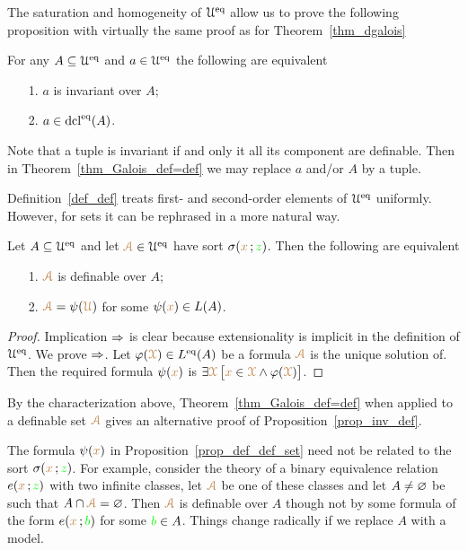 \documentclass[creche.tex]{subfiles}
\begin{document}
The saturation and homogeneity of $\EuScript U^{{\rm eq}}$ allow us to prove the following proposition with virtually the same proof as for Theorem~\ref{thm_dgalois}

\begin{theorem}\label{thm_Galois_def=def}
For any $A\subseteq\EuScript U^{{\rm eq}}$ and $a\in\EuScript U^{{\rm eq}}$ the following are equivalent
\begin{itemize}
\item[1.] $a$ is invariant over $A$;
\item[2.] $a\in\mathop{\rm dcl}^{{\rm eq}}(A)$.\QED
\end{itemize}
\end{theorem}

Note that a tuple is invariant if and only it all its component are definable. Then in Theorem~\ref{thm_Galois_def=def} we may replace $a$ and/or $A$ by a tuple.

Definition~\ref{def_def} treats first- and second-order elements of $\EuScript U^{{\rm eq}}$ uniformly. However, for sets it can be rephrased in a more natural way.

\begin{proposition}\label{prop_def_def_set}
Let $A\subseteq\EuScript U^{{\rm eq}}$ and let ${\color{brown}\EuScript A}\in\EuScript U^{{\rm eq}}$ have sort $\sigma({\color{brown} x}\,;{\color{green} z})$. Then the following are equivalent
\begin{itemize}
\item[1.] ${\color{brown}\EuScript A}$ is definable over $A$;
\item[2.] ${\color{brown}\EuScript A}=\psi({\color{brown}\EuScript U})$ for some $\psi({\color{brown} x})\in L(A)$.
\end{itemize}
\end{proposition}

\begin{proof}
Implication $\Rightarrow$ is clear because extensionality is implicit in the definition of $\EuScript U^{{\rm eq}}$. We prove $\Rightarrow$. Let $\varphi({\color{brown}\EuScript X})\in L^{{\rm eq}}(A)$ be a formula ${\color{brown}\EuScript A}$ is the unique solution of. Then the required formula $\psi({\color{brown} x})$ is $\exists {\color{brown}\EuScript X}\,\big[{\color{brown} x}\in {\color{brown}\EuScript X}\wedge\varphi({\color{brown}\EuScript X})\big]$.
\end{proof}

By the characterization above, Theorem~\ref{thm_Galois_def=def} when applied to a definable set ${\color{brown}\EuScript A}$ gives an alternative proof of Proposition~\ref{prop_inv_def}.

The formula $\psi({\color{brown} x})$ in Proposition~\ref{prop_def_def_set} need not be related to the sort $\sigma({\color{brown} x}\,;{\color{green} z})$. For example, consider the theory of a binary equivalence relation $e({\color{brown} x}\,;{\color{green} z})$ with two infinite classes, let ${\color{brown}\EuScript A}$ be one of these classes and let $A\neq\varnothing$ be such that $A\cap {\color{brown}\EuScript A}=\varnothing$. Then ${\color{brown}\EuScript A}$ is definable over $A$ though not by some formula of the form $e({\color{brown} x}\,;{\color{green} b})$ for some ${\color{green} b}\in A$. Things change radically if we replace $A$ with a model.  
\end{document}
